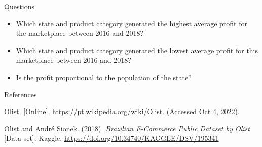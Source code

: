 \documentclass[aspectratio=169]{beamer}
\begin{document}
\begin{frame}{Questions}
\begin{itemize}
    \item Which state and product category generated the highest average profit
            for the marketplace between 2016 and 2018?
    \item Which state and product category generated the lowest average profit
            for this marketplace between 2016 and 2018?
    \item Is the profit proportional to the population of the state?
\end{itemize}
\end{frame}

\begin{frame}{References}


\begin{thebibliography}{2}

 Olist. [Online]. \url{https://pt.wikipedia.org/wiki/Olist}.
(Accessed Oct 4, 2022).

 Olist and André Sionek. (2018). {\em Brazilian
E-Commerce Public Dataset by Olist} [Data set]. Kaggle.
\url{https://doi.org/10.34740/KAGGLE/DSV/195341}

\end{thebibliography}
\end{frame}
\end{document}
